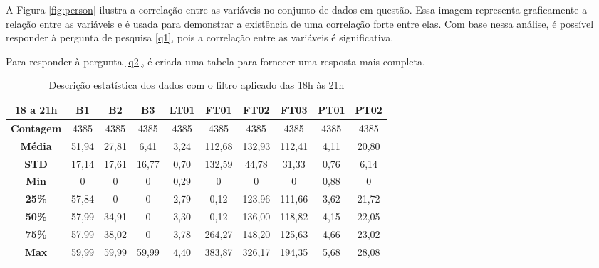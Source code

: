A Figura \ref{fig:person} ilustra a correlação entre as variáveis no conjunto de dados em questão. Essa imagem representa graficamente a relação entre as variáveis e é usada para demonstrar a existência de uma correlação forte entre elas. Com base nessa análise, é possível responder à pergunta de pesquisa \ref{q1}, pois a correlação entre as variáveis é significativa.

Para responder à pergunta \ref{q2}, é criada uma tabela para fornecer uma resposta mais completa.


\begin{table}[H]
	\centering
	\caption{Descrição estatística dos dados com o filtro aplicado das 18h às 21h}\label{tb:est}
	\begin{tabular}{@{}cccccccccc@{}}
		\toprule
		\textbf{18 a 21h}  & \textbf{B1} & \textbf{B2} & \textbf{B3} & \textbf{LT01} & \textbf{FT01} & \textbf{FT02} & \textbf{FT03} & \textbf{PT01} & \textbf{PT02} \\ \midrule
		\textbf{Contagem} & 4385    & 4385     & 4385     & 4385      & 4385       & 4385       & 4385       & 4385       & 4385       \\
		\textbf{Média}      & 51,94       & 27,81       & 6,41        & 3,24          & 112,68        & 132,93        & 112,41        & 4,11          & 20,80         \\
		\textbf{STD}       & 17,14       & 17,61       & 16,77       & 0,70          & 132,59        & 44,78         & 31,33         & 0,76          & 6,14          \\
		\textbf{Min}       & 0           & 0           & 0           & 0,29          & 0             & 0             & 0             & 0,88          & 0             \\
		\textbf{25\%}      & 57,84       & 0           & 0           & 2,79          & 0,12          & 123,96        & 111,66        & 3,62          & 21,72         \\
		\textbf{50\%}      & 57,99       & 34,91       & 0           & 3,30          & 0,12          & 136,00        & 118,82        & 4,15          & 22,05         \\
		\textbf{75\%}      & 57,99       & 38,02       & 0           & 3,78          & 264,27        & 148,20        & 125,63        & 4,66          & 23,02         \\
		\textbf{Max}       & 59,99       & 59,99       & 59,99       & 4,40          & 383,87        & 326,17        & 194,35        & 5,68          & 28,08         \\ \bottomrule
	\end{tabular}
	
\end{table}



